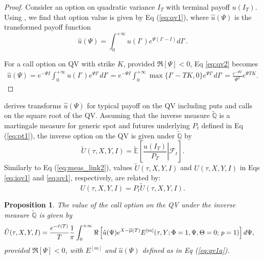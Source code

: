 \documentclass[11pt,a4paper] {article}
\newtheorem{proposition}{Proposition}[section]
\begin{document}
\begin{proof}
Consider an option on quadratic variance $I_T$ with terminal payoff $u(I_T)$. Using \cite{Sepp2008}, we find that option value is given by Eq (\ref{eq:qv1}),
where $\hat{u}(\Psi)$ is the transformed payoff function
\begin{equation}\label{eq:qv2}
\hat{u}(\Psi)=\int_0^{+\infty}u(I')e^{\Psi (I'-I)}dI'.
\end{equation}

For a call option on QV with strike $K$, provided $\Re[\Psi]<0$, Eq \eqref{eq:qv2} becomes
\begin{equation*}%
\begin{split}
\hat{u}(\Psi)=e^{-\Psi I}\int_0^{+\infty}u(I')e^{\Psi I'}dI'=e^{-\Psi I}\int_0^{+\infty}\max\{I'-TK,0\}e^{\Psi I'}dI'=
\frac{e^{-\Psi I}}{\Psi^2}e^{\Psi TK}.
\end{split}
\end{equation*} 

\end{proof}
\cite{Sepp2008} derives transforms $\hat{u}(\Psi)$ for typical payoff on the QV including puts and calls on the square root of the QV. Assuming that the inverse measure $\tilde{\mathbb{Q}}$ is a martingale measure for generic spot and futures underlying $P_{t}$ defined in Eq (\ref{eq:pt1}), the inverse option on the QV is given under $\tilde{\mathbb{Q}}$ by
\begin{equation}\label{eq:iqv1}
\tilde{U}(\tau, X, Y, I)=\tilde{\mathbb{E}}\left[\left.\frac{u(I_T)}{P_T}\right|\mathcal{F}_{t}\right].
\end{equation}
Similarly to Eq (\ref{eq:meas_link2}), values $\tilde{U}(\tau, X, Y, I)$ and $U(\tau, X, Y, I)$ in Eqs \eqref{eq:iqv1} and \eqref{eq:qv1}, respectively, are related by:
\begin{equation*}
U(\tau, X, Y, I)=P_t\tilde{U}(\tau, X, Y, I).
\end{equation*}


\begin{proposition}\label{qinv} The value of the call option on the QV under the inverse measure $\tilde{\mathbb{Q}}$ is given by
\begin{equation}\label{eq:iqv1a}
\begin{split}
\tilde{U}(\tau,X,Y,I)&=\frac{e^{-\bar{r}(T)}}{T}\frac{1}{\pi}\int_0^{+\infty}\Re\left[\hat{u}(\Psi) e^{X-\overline{\mu}(T)} E^{[m]}(\tau,Y; \Phi=1,\Psi,\Theta=0;\,p=1)\right]d\Psi,\vspace*{-1.0\baselineskip}
\end{split}
\end{equation}
provided $\Re[\Psi]<0$, with $E^{[m]}$ and $\hat{u}(\Psi)$ defined as in Eq (\ref{eq:qv1a}).
\end{proposition}
\end{document}
